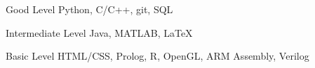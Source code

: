 \begin{cvskills}

  \cvskill
    {Good Level}
    {Python, C/C++, git, SQL}

  \cvskill
    {Intermediate Level}
    {Java, MATLAB, \LaTeX}

  \cvskill
    {Basic Level}
    {HTML/CSS, Prolog, R, OpenGL, ARM Assembly, Verilog}


\end{cvskills}
